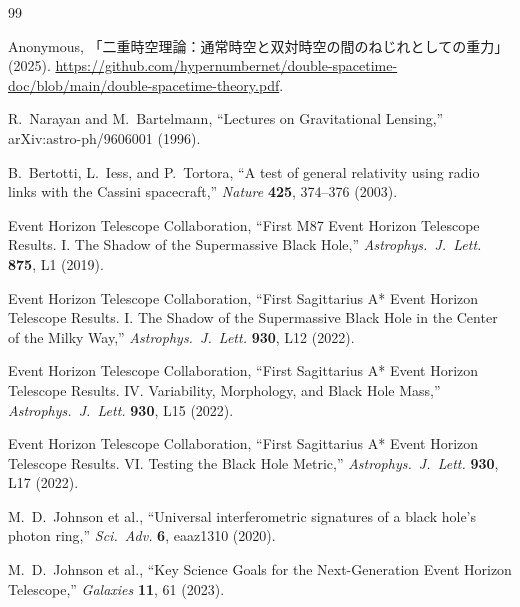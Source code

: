 \documentclass[a4paper]{article}
\begin{document}
\begin{thebibliography}{99}
\raggedright

Anonymous,
「二重時空理論：通常時空と双対時空の間のねじれとしての重力」 (2025).
\url{https://github.com/hypernumbernet/double-spacetime-doc/blob/main/double-spacetime-theory.pdf}.

R.~Narayan and M.~Bartelmann,
``Lectures on Gravitational Lensing,''
arXiv:astro-ph/9606001 (1996).

B.~Bertotti, L.~Iess, and P.~Tortora,
``A test of general relativity using radio links with the Cassini spacecraft,''
\textit{Nature} \textbf{425}, 374--376 (2003).

Event Horizon Telescope Collaboration,
``First M87 Event Horizon Telescope Results. I. The Shadow of the Supermassive Black Hole,''
\textit{Astrophys.\ J.\ Lett.} \textbf{875}, L1 (2019).

Event Horizon Telescope Collaboration,
``First Sagittarius A* Event Horizon Telescope Results. I. The Shadow of the Supermassive Black Hole in the Center of the Milky Way,''
\textit{Astrophys.\ J.\ Lett.} \textbf{930}, L12 (2022).

Event Horizon Telescope Collaboration,
``First Sagittarius A* Event Horizon Telescope Results. IV. Variability, Morphology, and Black Hole Mass,''
\textit{Astrophys.\ J.\ Lett.} \textbf{930}, L15 (2022).

Event Horizon Telescope Collaboration,
``First Sagittarius A* Event Horizon Telescope Results. VI. Testing the Black Hole Metric,''
\textit{Astrophys.\ J.\ Lett.} \textbf{930}, L17 (2022).

M.~D.~Johnson et al.,
``Universal interferometric signatures of a black hole's photon ring,''
\textit{Sci.\ Adv.} \textbf{6}, eaaz1310 (2020).

M.~D.~Johnson et al.,
``Key Science Goals for the Next-Generation Event Horizon Telescope,''
\textit{Galaxies} \textbf{11}, 61 (2023).

\end{thebibliography}
\end{document}
